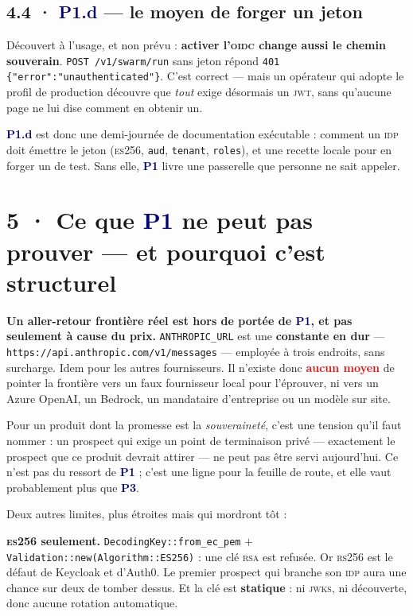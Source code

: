 \documentclass[10pt]{article}
\newcommand{\pire}[1]{\textcolor{red}{\textbf{#1}}}
\newcommand{\code}[1]{\texttt{\small #1}}
\newcommand{\mm}[1]{\textbf{\textcolor{navy}{#1}}}
\begin{document}
\subsection{4.4 · \mm{P1.d} --- le moyen de forger un jeton}

Découvert à l'usage, et non prévu : \textbf{activer l'\textsc{oidc} change aussi le chemin
souverain}. \code{POST /v1/swarm/run} sans jeton répond \code{401 \{"error":"unauthenticated"\}}.
C'est correct --- mais un opérateur qui adopte le profil de production découvre que \emph{tout}
exige désormais un \textsc{jwt}, sans qu'aucune page ne lui dise comment en obtenir un.

\mm{P1.d} est donc une demi-journée de documentation exécutable : comment un \textsc{idp} doit
émettre le jeton (\textsc{es}256, \code{aud}, \code{tenant}, \code{roles}), et une recette locale
pour en forger un de test. Sans elle, \mm{P1} livre une passerelle que personne ne sait appeler.

\section{5 · Ce que \mm{P1} ne peut pas prouver --- et pourquoi c'est structurel}

\begin{alerte}
\textbf{Un aller-retour frontière réel est hors de portée de \mm{P1}, et pas seulement à cause du
prix.} \code{ANTHROPIC\_URL} est une \textbf{constante en dur} ---
\code{https://api.anthropic.com/v1/messages} --- employée à trois endroits, sans surcharge.
Idem pour les autres fournisseurs. Il n'existe donc \pire{aucun moyen} de pointer la frontière vers
un faux fournisseur local pour l'éprouver, ni vers un Azure OpenAI, un Bedrock, un mandataire
d'entreprise ou un modèle sur site.

Pour un produit dont la promesse est la \emph{souveraineté}, c'est une tension qu'il faut nommer :
un prospect qui exige un point de terminaison privé --- exactement le prospect que ce produit
devrait attirer --- ne peut pas être servi aujourd'hui. Ce n'est pas du ressort de \mm{P1} ; c'est
une ligne pour la feuille de route, et elle vaut probablement plus que \mm{P3}.
\end{alerte}

Deux autres limites, plus étroites mais qui mordront tôt :

\textbf{\textsc{es}256 seulement.} \code{DecodingKey::from\_ec\_pem} $+$
\code{Validation::new(Algorithm::ES256)} : une clé \textsc{rsa} est refusée. Or \textsc{rs}256 est
le défaut de Keycloak et d'Auth0. Le premier prospect qui branche son \textsc{idp} aura une chance
sur deux de tomber dessus. Et la clé est \textbf{statique} : ni \textsc{jwks}, ni découverte, donc
aucune rotation automatique.
\end{document}

